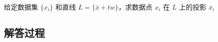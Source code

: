 \begin{example}[数据投影]
    给定数据集 \(\{x_i\}\) 和直线 \(L = \{\bar{x} + tw \}\)，求数据点 \(x_i\) 在 \(L\) 上的投影 \(\bar{x}_i\)
    \end{example}
    
    \subsection*{解答过程}
    